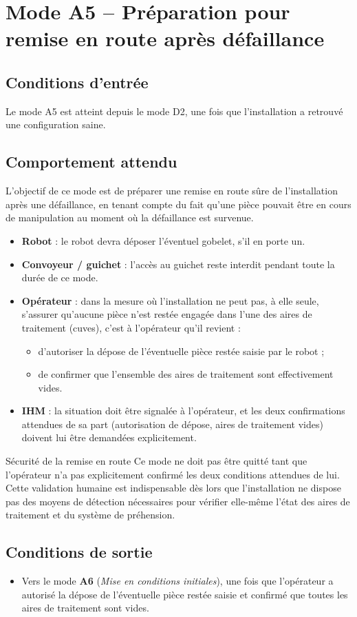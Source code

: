 \section{Mode A5 -- Préparation pour remise en route après défaillance}
\label{secModeA5}

\subsection{Conditions d'entrée}

Le mode A5 est atteint depuis le mode D2, une fois que l'installation a
retrouvé une configuration saine.

\subsection{Comportement attendu}

L'objectif de ce mode est de préparer une remise en route sûre de
l'installation après une défaillance, en tenant compte du fait qu'une
pièce pouvait être en cours de manipulation au moment où la défaillance
est survenue.

\begin{itemize}
    \item \textbf{Robot} : le robot devra déposer l'éventuel gobelet, s'il
    en porte un.
    \item \textbf{Convoyeur / guichet} : l'accès au guichet reste interdit
    pendant toute la durée de ce mode.
    \item \textbf{Opérateur} : dans la mesure où l'installation ne peut
    pas, à elle seule, s'assurer qu'aucune pièce n'est restée engagée dans
    l'une des aires de traitement (cuves), c'est à l'opérateur qu'il
    revient :
    \begin{itemize}
        \item d'autoriser la dépose de l'éventuelle pièce restée saisie par
        le robot ;
        \item de confirmer que l'ensemble des aires de traitement sont
        effectivement vides.
    \end{itemize}
    \item \textbf{IHM} : la situation doit être signalée à l'opérateur, et
    les deux confirmations attendues de sa part (autorisation de dépose,
    aires de traitement vides) doivent lui être demandées explicitement.
\end{itemize}

\begin{UPSTIwarning}{Sécurité de la remise en route}
Ce mode ne doit pas être quitté tant que l'opérateur n'a pas explicitement
confirmé les deux conditions attendues de lui. Cette validation humaine est
indispensable dès lors que l'installation ne dispose pas des moyens de
détection nécessaires pour vérifier elle-même l'état des aires de
traitement et du système de préhension.
\end{UPSTIwarning}

\subsection{Conditions de sortie}

\begin{itemize}
    \item Vers le mode \textbf{A6} (\emph{Mise en conditions initiales}),
    une fois que l'opérateur a autorisé la dépose de l'éventuelle pièce
    restée saisie et confirmé que toutes les aires de traitement sont
    vides.
\end{itemize}
